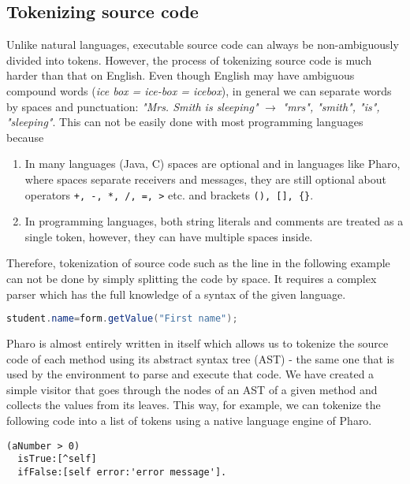 \subsection{Tokenizing source code}
\label{sec:TranslatingCode-TokenizingSource}

Unlike natural languages, executable source code can always be non-ambiguously divided into tokens. However, the process of tokenizing source code is much harder than that on English. Even though English may have ambiguous compound words (\textit{ice box = ice-box = icebox}), in general we can separate words by spaces and punctuation: \textit{"Mrs. Smith is sleeping"} $\rightarrow$ \textit{"mrs", "smith", "is", "sleeping"}. This can not be easily done with most programming languages because

\begin{enumerate}
  \item In many languages (Java, C) spaces are optional and in languages like Pharo, where spaces separate receivers and messages, they are still optional about operators \lstinline{+, -, *, /, =, >} etc. and brackets \lstinline|(), [], {}|.
  \item In programming languages, both string literals and comments are treated as a single token, however, they can have multiple spaces inside.
\end{enumerate}

Therefore, tokenization of source code such as the line in the following example can not be done by simply splitting the code by space. It requires a complex parser which has the full knowledge of a syntax of the given language.

\begin{lstlisting}[language=Java]
student.name=form.getValue("First name");
\end{lstlisting}

Pharo is almost entirely written in itself which allows us to tokenize the source code of each method using its abstract syntax tree (AST) - the same one that is used by the environment to parse and execute that code. We have created a simple visitor that goes through the nodes of an AST of a given method and collects the values from its leaves. This way, for example, we can tokenize the following code into a list of tokens using a native language engine of Pharo.

\begin{lstlisting}
(aNumber > 0)
  isTrue:[^self]
  ifFalse:[self error:'error message'].
\end{lstlisting}

